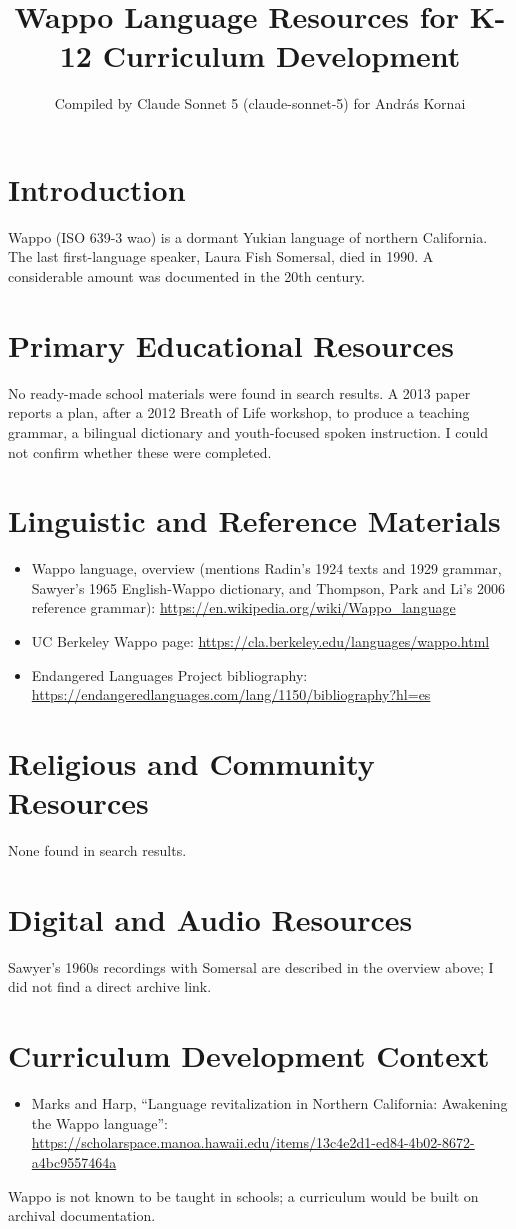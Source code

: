 \documentclass[12pt]{article}
\title{Wappo Language Resources for K-12 Curriculum Development}
\author{Compiled by Claude Sonnet 5 (claude-sonnet-5) for Andr\'as Kornai}
\date{}
\begin{document}
\maketitle
\section{Introduction}
Wappo (ISO 639-3 wao) is a dormant Yukian language of northern California. The last first-language speaker, Laura Fish Somersal, died in 1990. A considerable amount was documented in the 20th century.
\section{Primary Educational Resources}
No ready-made school materials were found in search results. A 2013 paper reports a plan, after a 2012 Breath of Life workshop, to produce a teaching grammar, a bilingual dictionary and youth-focused spoken instruction. I could not confirm whether these were completed.
\section{Linguistic and Reference Materials}
\begin{itemize}
\item Wappo language, overview (mentions Radin's 1924 texts and 1929 grammar, Sawyer's 1965 English-Wappo dictionary, and Thompson, Park and Li's 2006 reference grammar): \url{https://en.wikipedia.org/wiki/Wappo_language}
\item UC Berkeley Wappo page: \url{https://cla.berkeley.edu/languages/wappo.html}
\item Endangered Languages Project bibliography: \url{https://endangeredlanguages.com/lang/1150/bibliography?hl=es}
\end{itemize}
\section{Religious and Community Resources}
None found in search results.
\section{Digital and Audio Resources}
Sawyer's 1960s recordings with Somersal are described in the overview above; I did not find a direct archive link.
\section{Curriculum Development Context}
\begin{itemize}
\item Marks and Harp, ``Language revitalization in Northern California: Awakening the Wappo language'': \url{https://scholarspace.manoa.hawaii.edu/items/13c4e2d1-ed84-4b02-8672-a4bc9557464a}
\end{itemize}
Wappo is not known to be taught in schools; a curriculum would be built on archival documentation.
\end{document}
